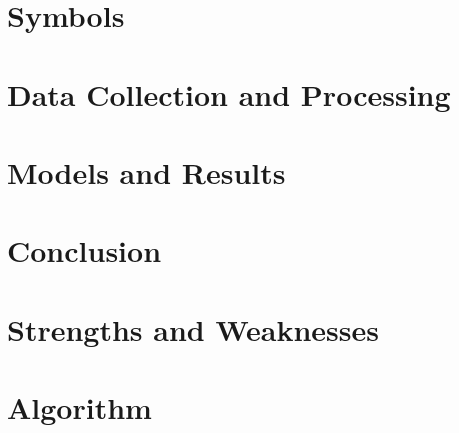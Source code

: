 \documentclass[12pt,letterpaper,scheme=plain,fontset=none]{ctexart}
\begin{document}
\section{Symbols}
\section{Data Collection and Processing}
\section{Models and Results}
\section{Conclusion}
\section{Strengths and Weaknesses}

% 
% 

\appendix
\section{Algorithm}

\label{SchoolLastPage}
\end{document}
